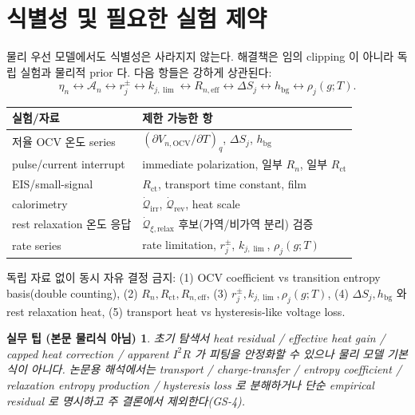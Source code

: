 \documentclass[11pt,a4paper]{article}
\newtheorem*{practicebox}{실무 팁 (본문 물리식 아님)}
\newcommand{\eff}{\mathrm{eff}}
\newcommand{\bg}{\mathrm{bg}}
\newcommand{\OCV}{\mathrm{OCV}}
\newcommand{\irr}{\mathrm{irr}}
\newcommand{\rev}{\mathrm{rev}}
\newcommand{\ct}{\mathrm{ct}}
\newcommand{\rlx}{\mathrm{relax}}
\begin{document}
\section{식별성 및 필요한 실험 제약}\label{sec:ch4_ident}
물리 우선 모델에서도 식별성은 사라지지 않는다. 해결책은 임의 clipping 이 아니라 독립 실험과 물리적 prior 다.
다음 항들은 강하게 상관된다:
\begin{equation}
\eta_n\leftrightarrow\mathcal A_n\leftrightarrow r_j^\pm\leftrightarrow k_{j,\lim}\leftrightarrow R_{n,\eff}\leftrightarrow\Delta S_j\leftrightarrow h_\bg\leftrightarrow\rho_j(g;T).
\label{eq:ch4_ident}
\end{equation}
\begin{longtable}{p{} >{\raggedright\arraybackslash}p{}}
\toprule 실험/자료 & 제한 가능한 항 \\ \midrule \endhead
저율 OCV 온도 series & $(\partial V_{n,\OCV}/\partial T)_q$, $\Delta S_j$, $h_\bg$ \\
pulse/current interrupt & immediate polarization, 일부 $R_n$, 일부 $R_\ct$ \\
EIS/small-signal & $R_\ct$, transport time constant, film \\
calorimetry & $\dot{\mathcal Q}_{\irr}$, $\dot{\mathcal Q}_{\rev}$, heat scale \\
rest relaxation 온도 응답 & $\dot{\mathcal Q}_{\xi,\rlx}$ 후보(가역/비가역 분리) 검증 \\
rate series & rate limitation, $r_j^\pm$, $k_{j,\lim}$, $\rho_j(g;T)$ \\
\bottomrule
\end{longtable}
독립 자료 없이 동시 자유 결정 금지: (1) OCV coefficient vs transition entropy basis(double counting),
(2) $R_n,R_\ct,R_{n,\eff}$, (3) $r_j^\pm,k_{j,\lim},\rho_j(g;T)$, (4) $\Delta S_j,h_\bg$ 와 rest relaxation
heat, (5) transport heat vs hysteresis-like voltage loss.
\begin{practicebox}
초기 탐색서 heat residual / effective heat gain / capped heat correction / apparent $I^2R$ 가 피팅을
안정화할 수 있으나 \emph{물리 모델 기본식이 아니다}. 논문용 해석에서는 transport / charge-transfer / entropy
coefficient / relaxation entropy production / hysteresis loss 로 분해하거나 단순 empirical residual 로 명시하고
주 결론에서 제외한다(GS-4).
\end{practicebox}

\end{document}
